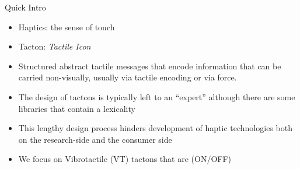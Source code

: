 
\begin{frame}{Quick Intro}
    
    \begin{itemize}
        \item Haptics: the sense of touch
        \item Tacton: \textit{Tactile Icon}
        \item Structured abstract tactile messages that encode information that can be carried non-visually, usually via tactile encoding or via force.
        \item The design of tactons is typically left to an ``expert'' although there are some libraries that contain a lexicality
        \item This lengthy design process hinders development of haptic technologies both on the research-side and the consumer side
        \item We focus on Vibrotactile (VT) tactons that are  (ON/OFF)
    \end{itemize}
    
\end{frame}